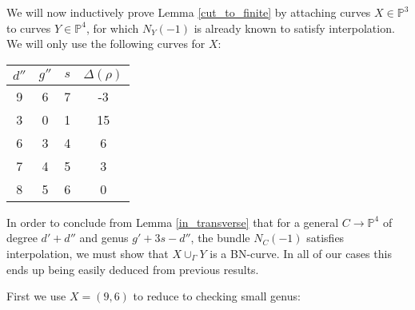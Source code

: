 \documentclass[11pt]{amsart}
\newcommand{\pp}{\mathbb{P}}
\theoremstyle{definition}
\theoremstyle{remark}
\begin{document}
We will now inductively prove Lemma \ref{cut_to_finite} by attaching curves $X \in \pp^3$ to curves $Y \in \pp^4$, for which $N_Y(-1)$ is already known to satisfy interpolation.  We will only use the following curves for $X$:
\begin{center}
\begin{tabular}{c | c | c | c}
$d''$ & $g''$ & $s$ & $\Delta(\rho)$ \\ \hline
9 & 6 & 7 & -3 \\
3 & 0 & 1 & 15\\
6 & 3 & 4 & 6\\
7 & 4 & 5 & 3\\
8 & 5 & 6 & 0
\end{tabular}
\end{center}
In order to conclude from Lemma \ref{in_transverse} that for a general $C \to \pp^4$ of degree $d' + d''$ and genus $g' + 3s - d''$, the bundle $N_C(-1)$ satisfies interpolation, we must show that $X \cup_{\Gamma} Y$ is a BN-curve.  In all of our cases this ends up being easily deduced from previous results.

First we use $X = (9,6)$ to reduce to checking small genus:
\end{document}

